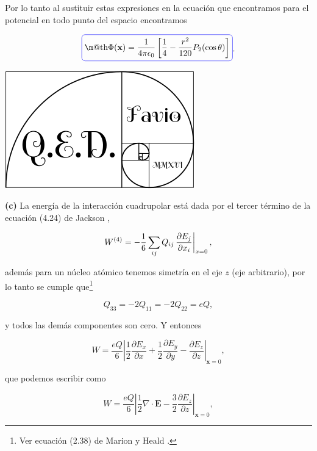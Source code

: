 \documentclass[a4paper,11pt]{article}
\makeatletter
\numberwithin{equation}{section}
\newcommand{\zerodel}{.\kern-\nulldelimiterspace}
\newcommand*{\boxcolor}{blue}
\renewcommand{\boxed}[1]{\textcolor{\boxcolor}{%
\tikz[baseline={([yshift=-1ex]current bounding box.center)}] \node [rectangle, minimum width=1ex,rounded corners,draw] {\normalcolor\m@th$\displaystyle#1$};}}
\makeatother
\begin{document}
Por lo tanto al sustituir estas expresiones en la ecuación que encontramos para el 
potencial en todo punto del espacio encontramos 

\begin{equation}
 \boxed{\Phi(\mathbf{x}) = \frac{1}{4\pi\epsilon_0}\left[\frac{1}{4} - \frac{r^2}{120} 
 P_2(\cos{\theta})\right]}.
\end{equation}

\hspace{10cm}\includegraphics[scale=0.25]{logoQED}

\textbf{(c)} La energía de la interacción cuadrupolar está dada por el tercer término
de la ecuación (4.24) de Jackson \cite{jackson}, 

\begin{equation}
 W^{(4)} = -\frac{1}{6}\sum_{ij} Q_{ij} \left\zerodel\frac{\partial E_j}{\partial x_i}
 \right|_{x=0},
\end{equation}

además para un núcleo atómico tenemos simetría en el eje $z$ (eje arbitrario), por 
lo tanto se cumple que\footnote{Ver ecuación (2.38) de Marion y Heald \cite{marion2}.} 

\begin{equation}
 Q_{33} = - 2Q_{11} = - 2Q_{22} = eQ,
\end{equation}

y todos las demás componentes son cero. Y entonces 

\begin{equation}
 W = \frac{eQ}{6}\left|\frac{1}{2}\frac{\partial E_x}{\partial x} + 
 \frac{1}{2}\frac{\partial E_y}{\partial y} - \frac{\partial E_z}{\partial z}
 \right|_{\mathbf{x}=0}, 
\end{equation}

que podemos escribir como 

\begin{equation}
 W = \frac{eQ}{6}\left|\frac{1}{2}\nabla \cdot \mathbf{E} 
 - \frac{3}{2}\frac{\partial E_z}{\partial z}\right|_{\mathbf{x}=0},
\end{equation}
\end{document}
